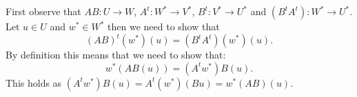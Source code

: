 First observe that $AB:U \to W$, $A^t:W^* \to V^*$, $B^t:V^* \to U^*$ and $(B^tA^t):W^* \to U^*$.
Let $u\in U$ and $w^* \in W^*$ then we need to show that
\[(AB)^t(w^*)(u)=(B^tA^t)(w^*)(u). \]
By definition this means that we need to show that:
\[w^*(AB(u))=(A^tw^*)B(u).\]
This holds as $(A^tw^*)B(u)=A^t(w^*)(Bu)=w^*(AB)(u)$.
